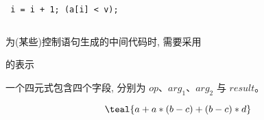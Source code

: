 \begin{frame}{}
  \begin{center}
    \texttt{ i = i + 1;  (a[i] < v);}
  \end{center}

  \vspace{0.80cm}
  \begin{columns}
      \pause
  \end{columns}

  \pause
  \vspace{0.60cm}
  \begin{center}
    为(某些)控制语句生成的中间代码时, 需要采用
  \end{center}
\end{frame}

\begin{frame}{}
  \begin{center}
    的表示

    \begin{definition}
      一个四元式包含四个字段, 分别为 $op$、$arg_{1}$、$arg_{2}$ 与 $result$。
    \end{definition}

    \pause
    \vspace{-0.50cm}
    \[
      \teal{a + a \ast (b - c) + (b - c) \ast d}
    \]
    \vspace{-0.80cm}
    \begin{columns}
    \end{columns}
  \end{center}
\end{frame}

